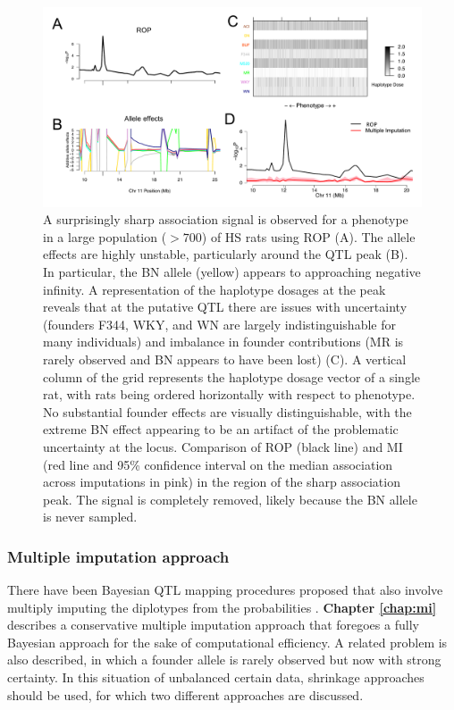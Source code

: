 \begin{figure}
\centering
\includegraphics[width=\textwidth, trim={0in 0in 0in 0in}, clip]{figures/1-introduction/mi_example.pdf}
\caption[Example of artificial QTL with ROP]{A surprisingly sharp association signal is observed for a phenotype in a large population ($>700$) of HS rats using ROP (A). The allele effects are highly unstable, particularly around the QTL peak (B). In particular, the BN allele (yellow) appears to approaching negative infinity. A representation of the haplotype dosages at the peak reveals that at the putative QTL there are issues with uncertainty (founders F344, WKY, and WN are largely indistinguishable for many individuals) and imbalance in founder contributions (MR is rarely observed and BN appears to have been lost) (C). A vertical column of the grid represents the haplotype dosage vector of a single rat, with rats being ordered horizontally with respect to phenotype. No substantial founder effects are visually distinguishable, with the extreme BN effect appearing to be an artifact of the problematic uncertainty at the locus. Comparison of ROP (black line) and MI (red line and 95\% confidence interval on the median association across imputations in pink) in the region of the sharp association peak. The signal is completely removed, likely because the BN allele is never sampled. \label{fig:mi_example}}
\end{figure}

\subsubsection{Multiple imputation approach}

There have been Bayesian QTL mapping procedures proposed that also involve multiply imputing the diplotypes from the probabilities \citep{Sen2001,Durrant2010}. \textbf{Chapter \ref{chap:mi}} describes a conservative multiple imputation approach that foregoes a fully Bayesian approach for the sake of computational efficiency. A related problem is also described, in which a founder allele is rarely observed but now with strong certainty. In this situation of unbalanced certain data, shrinkage approaches \cite{Wei2016} should be used, for which two different approaches are discussed. 

